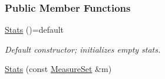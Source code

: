 \subsubsection*{Public Member Functions}
\begin{DoxyCompactItemize}
\item 
\hyperlink{structStats_a88e22fc26e9c8af13b6e0b4ce72e2f98}{Stats} ()=default\hypertarget{structStats_a88e22fc26e9c8af13b6e0b4ce72e2f98}{}\label{structStats_a88e22fc26e9c8af13b6e0b4ce72e2f98}

\begin{DoxyCompactList}\small\item\em Default constructor; initializes empty stats. \end{DoxyCompactList}\item 
\hyperlink{structStats_a9227cef4f5d25dfb17520bd040b493f3}{Stats} (const \hyperlink{structMeasureSet}{Measure\+Set} \&m)\hypertarget{structStats_a9227cef4f5d25dfb17520bd040b493f3}{}\label{structStats_a9227cef4f5d25dfb17520bd040b493f3}


\end{DoxyCompactItemize}
